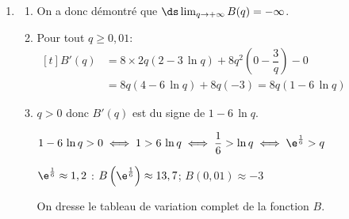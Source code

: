 \begin{enumerate}
\item 
	\begin{enumerate}
		\item%

On a donc démontré que $\ds\lim_{q \to +\infty} B(q)=-\infty$.

		\item Pour tout $q \geqslant 0,01$: 
$\begin{aligned}[t]
B'(q) 
& = 8\times 2q\left (2-3\,\ln q\right ) +8q^2\left (0 -\dfrac{3}{q}\right ) - 0\\
& = 8q\left (4 - 6\,\ln q\right ) + 8q\left (-3\right )
= 8q \left (1 - 6\,\ln q\right )
\end{aligned}$
		
		\item %
$q>0$ donc $B'(q)$ est du signe de $1- 6\,\ln q$.

$1- 6\,\ln q>0
\iff
1> 6\,\ln q
\iff
\dfrac{1}{6} > \ln q
\iff
\e^{\frac{1}{6}} > q$

$\e^{\frac{1}{6}} \approx 1,2$ : $B\left (\e^{\frac{1}{6}} \right ) \approx 13,7$;
$B(0,01) \approx -3$

On dresse le tableau de variation complet de la fonction $B$.


\end{enumerate}
\end{enumerate}

